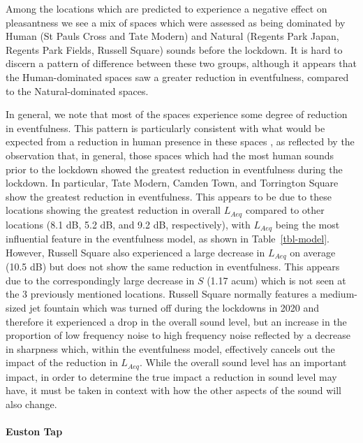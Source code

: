 \documentclass[
  authoryear,
  preprint,
  3p,
  onecolumn]{elsarticle}
\let\oldparagraph\paragraph
\renewcommand{\paragraph}[1]{\oldparagraph{#1}\mbox{}}
\begin{document}
Among the locations which are predicted to experience a negative effect
on pleasantness we see a mix of spaces which were assessed as being
dominated by Human (St Pauls Cross and Tate Modern) and Natural (Regents
Park Japan, Regents Park Fields, Russell Square) sounds before the
lockdown. It is hard to discern a pattern of difference between these
two groups, although it appears that the Human-dominated spaces saw a
greater reduction in eventfulness, compared to the Natural-dominated
spaces.

In general, we note that most of the spaces experience some degree of
reduction in eventfulness. This pattern is particularly consistent with
what would be expected from a reduction in human presence in these
spaces \citep{Aletta2018Towards}, as reflected by the observation that,
in general, those spaces which had the most human sounds prior to the
lockdown showed the greatest reduction in eventfulness during the
lockdown. In particular, Tate Modern, Camden Town, and Torrington Square
show the greatest reduction in eventfulness. This appears to be due to
these locations showing the greatest reduction in overall \(L_{Aeq}\)
compared to other locations (8.1 dB, 5.2 dB, and 9.2 dB, respectively),
with \(L_{Aeq}\) being the most influential feature in the eventfulness
model, as shown in Table~\ref{tbl-model}. However, Russell Square also
experienced a large decrease in \(L_{Aeq}\) on average (10.5 dB) but
does not show the same reduction in eventfulness. This appears due to
the correspondingly large decrease in \(S\) (1.17 acum) which is not
seen at the 3 previously mentioned locations. Russell Square normally
features a medium-sized jet fountain which was turned off during the
lockdowns in 2020 and therefore it experienced a drop in the overall
sound level, but an increase in the proportion of low frequency noise to
high frequency noise reflected by a decrease in sharpness which, within
the eventfulness model, effectively cancels out the impact of the
reduction in \(L_{Aeq}\). While the overall sound level has an important
impact, in order to determine the true impact a reduction in sound level
may have, it must be taken in context with how the other aspects of the
sound will also change.

\hypertarget{euston-tap}{%
\paragraph{Euston Tap}\label{euston-tap}}
\end{document}
